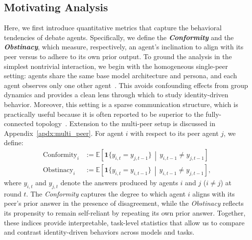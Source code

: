\documentclass{article}
\begin{document}
\subsection{Motivating Analysis}
\label{sec:motivating_analysis}
Here, we first introduce quantitative metrics that capture the behavioral tendencies of debate agents. 
Specifically, we define the \emph{\textbf{Conformity}} and the \emph{\textbf{Obstinacy}}, which measure, respectively, an agent’s inclination to align with its peer versus to adhere to its own prior output.
To ground the analysis in the simplest nontrivial interaction, we begin with the homogeneous single-peer setting: agents share the same base model architecture and persona, and each agent observes only one other agent~\citep{chanchateval,du2024improving,li2024improving,wang2024rethinking,zhang2024cut}. This avoids confounding effects from group dynamics and provides a clean lens through which to study identity-driven behavior. Moreover, this setting is a sparse communication structure, which is practically useful because it is often reported to be superior to the fully-connected topology~\citep{li2024improving,estornell2024multi,zhang2024cut}. Extension to the multi-peer setup is discussed in Appendix~\ref{apdx:multi_peer}.
For agent $i$ with respect to its peer agent $j$, we define:
\begin{align*}
    \text{Conformity}_i &:= \mathbb{E}\left[\mathbf{1}\{y_{i,t} = y_{j,t-1}\} \,\middle|\, y_{i,t-1} \neq y_{j,t-1}\right] \\
    \text{Obstinacy}_i &:= \mathbb{E}\left[\mathbf{1}\{y_{i,t} = y_{i,t-1}\} \,\middle|\, y_{i,t-1} \neq y_{j,t-1}\right],
\end{align*}
where $y_{i,t}$ and $y_{j,t}$ denote the answers produced by agents $i$ and $j$ ($i\neq j$) at round $t$.  
The \emph{Conformity} captures the degree to which agent $i$ aligns with its peer’s prior answer in the presence of disagreement, while the \emph{Obstinacy} reflects its propensity to remain self-reliant by repeating its own prior answer. 
Together, these indices provide interpretable, task-level statistics that allow us to compare and contrast identity-driven behaviors across models and tasks.
\end{document}
